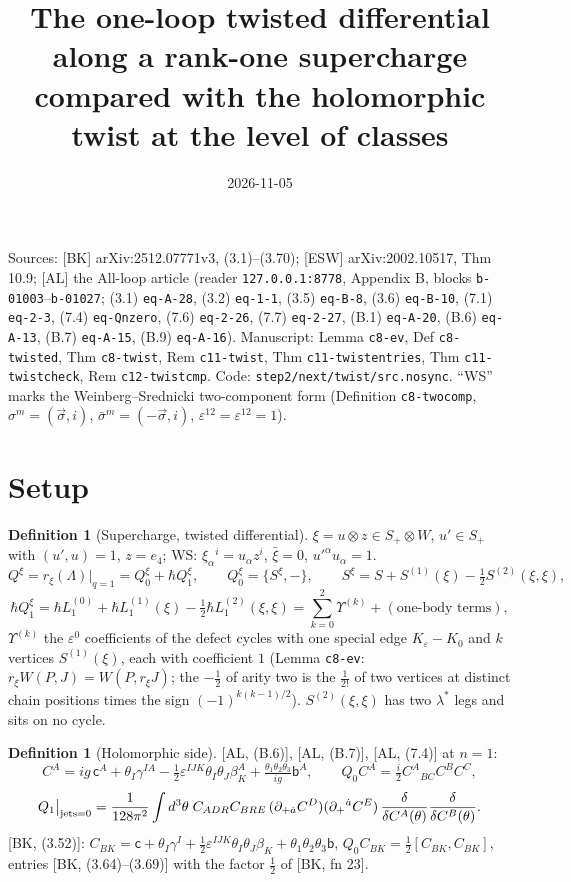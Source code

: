 \documentclass[11pt]{article}
\title{The one-loop twisted differential along a rank-one supercharge\\ compared with the holomorphic twist at the level of classes}
\author{}\date{2026-11-05}
\theoremstyle{definition}
\newtheorem{definition}[theorem]{Definition}
\newcommand{\Qx}{Q^{\xi}}
\newcommand{\WS}{\textup{WS}}
\begin{document}
\maketitle

\noindent Sources: [BK] arXiv:2512.07771v3, (3.1)--(3.70); [ESW] arXiv:2002.10517, Thm 10.9; [AL] the All-loop article (reader \texttt{127.0.0.1:8778}, Appendix B, blocks \texttt{b-01003}--\texttt{b-01027}; (3.1) \texttt{eq-A-28}, (3.2) \texttt{eq-1-1}, (3.5) \texttt{eq-B-8}, (3.6) \texttt{eq-B-10}, (7.1) \texttt{eq-2-3}, (7.4) \texttt{eq-Qnzero}, (7.6) \texttt{eq-2-26}, (7.7) \texttt{eq-2-27}, (B.1) \texttt{eq-A-20}, (B.6) \texttt{eq-A-13}, (B.7) \texttt{eq-A-15}, (B.9) \texttt{eq-A-16}). Manuscript: Lemma \texttt{c8-ev}, Def \texttt{c8-twisted}, Thm \texttt{c8-twist}, Rem \texttt{c11-twist}, Thm \texttt{c11-twistentries}, Thm \texttt{c11-twistcheck}, Rem \texttt{c12-twistcmp}. Code: \texttt{step2/next/twist/src.nosync}. ``\WS'' marks the Weinberg--Srednicki two-component form (Definition \texttt{c8-twocomp}, $\sigma^m=(\vec\sigma,i)$, $\bar\sigma^m=(-\vec\sigma,i)$, $\varepsilon^{12}=\varepsilon^{\dot1\dot2}=1$).

\section{Setup}

\begin{definition}[Supercharge, twisted differential]
$\xi=u\otimes z\in S_+\otimes W$, $u'\in S_+$ with $(u',u)=1$, $z=e_4$; \WS: $\xi_\alpha{}^i=u_\alpha z^i$, $\bar\xi=0$, $u'^\alpha u_\alpha=1$.
\[
\Qx=r_\xi(\Lambda)|_{q=1}=\Qx_0+\hbar\Qx_1,\qquad \Qx_0=\{S^\xi,-\},\qquad S^\xi=S+S^{(1)}(\xi)-\tfrac12S^{(2)}(\xi,\xi),
\]
\[
\hbar\Qx_1=\hbar L_1^{(0)}+\hbar L_1^{(1)}(\xi)-\tfrac12\hbar L_1^{(2)}(\xi,\xi)=\sum_{k=0}^{2}\Upsilon^{(k)}+(\text{one-body terms}),
\]
$\Upsilon^{(k)}$ the $\varepsilon^0$ coefficients of the defect cycles with one special edge $K_\varepsilon-K_0$ and $k$ vertices $S^{(1)}(\xi)$, each with coefficient $1$ (Lemma \texttt{c8-ev}: $r_\xi W(P,J)=W(P,r_\xi J)$; the $-\tfrac12$ of arity two is the $\tfrac1{2!}$ of two vertices at distinct chain positions times the sign $(-1)^{k(k-1)/2}$). $S^{(2)}(\xi,\xi)$ has two $\lambda^*$ legs and sits on no cycle.
\end{definition}

\begin{definition}[Holomorphic side]
[AL, (B.6)], [AL, (B.7)], [AL, (7.4)] at $n=1$:
\[
C^A=ig\,\mathsf c^A+\theta_I\gamma^{IA}-\tfrac12\varepsilon^{IJK}\theta_I\theta_J\beta_K^A+\tfrac{\theta_1\theta_2\theta_3}{ig}\mathsf b^A,\qquad Q_0C^A=\tfrac i2C^A{}_{BC}C^BC^C,
\]
\[
Q_1\big|_{\rm jets=0}=\frac{1}{128\pi^2}\int d^3\theta\;C_{ADR}C_{BRE}\,(\partial_{+\dot a}C^D)(\partial_+{}^{\dot a}C^E)\,\frac{\delta}{\delta C^A(\theta)}\frac{\delta}{\delta C^B(\theta)} .
\]
[BK, (3.52)]: $C_{BK}=\mathsf c+\theta_I\gamma^I+\tfrac12\varepsilon^{IJK}\theta_I\theta_J\beta_K+\theta_1\theta_2\theta_3\mathsf b$, $Q_0C_{BK}=\tfrac12[C_{BK},C_{BK}]$, entries [BK, (3.64)--(3.69)] with the factor $\tfrac12$ of [BK, fn 23].
\end{definition}
\end{document}

